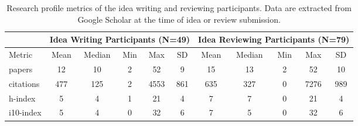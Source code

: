 \begin{table}[t]
\small
\centering
\begin{tabular}{l c c c c c | c c c c c} 
 \hline
 & \multicolumn{5}{c|}{Idea Writing Participants (N=49)} & \multicolumn{5}{c}{Idea Reviewing Participants (N=79)} \\ 
 \hline
 Metric & Mean & Median & Min & Max & SD & Mean & Median & Min & Max & SD \\ 
 \hline
papers & 12 & 10 &  2 & 52 & 9 & 15 & 13 & 2 & 52 & 10 \\ 
citations & 477 & 125 & 2 & 4553 & 861 & 635 & 327 & 0 & 7276 & 989 \\
h-index & 5 & 4 & 1 & 21 & 4 & 7 & 7 & 0 & 21 & 4 \\
i10-index & 5 & 4 & 0 & 32 & 6 & 7 & 5 & 0 & 32 & 6 \\
 \hline
\end{tabular}
\caption{Research profile metrics of the idea writing and reviewing participants. Data are extracted from Google Scholar at the time of idea or review submission.}
\label{table:merged_profile}
\end{table}







